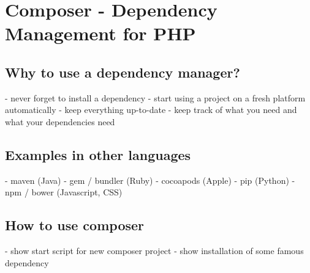 \chapter{Composer - Dependency Management for PHP}

\section{Why to use a dependency manager?}
- never forget to install a dependency
- start using a project on a fresh platform automatically
- keep everything up-to-date
- keep track of what you need and what your dependencies need


\section{Examples in other languages}
- maven (Java)
- gem / bundler (Ruby)
- cocoapods (Apple)
- pip (Python)
- npm / bower (Javascript, CSS)

\section{How to use composer}
- show start script for new composer project
- show installation of some famous dependency
